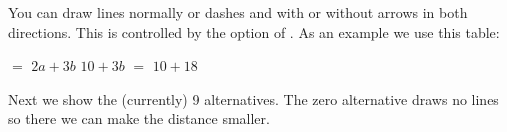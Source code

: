 \typebuffer \processxmlbuffer

\stopsection

\startsection[title=Lines]

You can draw lines normally or dashes and with or without arrows in both
directions. This is controlled by the  option of \type
{\setupSTEPaligntable}. As an example we use this table:

\startbuffer[table]
\startSTEPaligntable
     {$=$} {$2a+3b$}
     {$10+3b$}
     {$=$} {$10+18$}
\stopSTEPaligntable
\stopbuffer

\typebuffer[table]

Next we show the (currently) 9 alternatives. The zero alternative draws no lines
so there we can make the distance smaller.

\startbuffer
\setupSTEPlines
  [alternative=0,
   width=.5em]
\stopbuffer

\typebuffer \startlinecorrection \getbuffer \getbuffer[table] \stoplinecorrection

\startbuffer
\setupSTEPlines
  [alternative=1]
\stopbuffer

\typebuffer \startlinecorrection \getbuffer \getbuffer[table] \stoplinecorrection

\startbuffer
\setupSTEPlines
  [alternative=2]
\stopbuffer

\typebuffer \startlinecorrection \getbuffer \getbuffer[table] \stoplinecorrection

\startbuffer
\setupSTEPlines
  [alternative=3]
\stopbuffer

\typebuffer \startlinecorrection \getbuffer \getbuffer[table] \stoplinecorrection

\startbuffer
\setupSTEPlines
  [alternative=4]
\stopbuffer

\typebuffer \startlinecorrection \getbuffer \getbuffer[table] \stoplinecorrection

\startbuffer
\setupSTEPlines
  [alternative=5]
\stopbuffer

\typebuffer \startlinecorrection \getbuffer \getbuffer[table] \stoplinecorrection

\startbuffer
\setupSTEPlines
  [alternative=6]
\stopbuffer

\typebuffer \startlinecorrection \getbuffer \getbuffer[table] \stoplinecorrection

\startbuffer
\setupSTEPlines
  [alternative=7]
\stopbuffer

